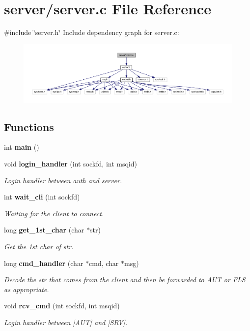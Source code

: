 \section{server/server.c File Reference}
\label{server_8c}
{\ttfamily \#include \char`\"{}server.\+h\char`\"{}}\newline
Include dependency graph for server.\+c\+:
\nopagebreak
\begin{figure}[H]
\begin{center}
\leavevmode
\includegraphics[width=350pt]{server_8c__incl}
\end{center}
\end{figure}
\subsection*{Functions}
\begin{DoxyCompactItemize}
\item 
int \textbf{ main} ()
\item 
void \textbf{ login\+\_\+handler} (int sockfd, int msqid)
\begin{DoxyCompactList}\small\item\em Login handler between auth and server. \end{DoxyCompactList}\item 
int \textbf{ wait\+\_\+cli} (int sockfd)
\begin{DoxyCompactList}\small\item\em Waiting for the client to connect. \end{DoxyCompactList}\item 
long \textbf{ get\+\_\+1st\+\_\+char} (char $\ast$str)
\begin{DoxyCompactList}\small\item\em Get the 1st char of str. \end{DoxyCompactList}\item 
long \textbf{ cmd\+\_\+handler} (char $\ast$cmd, char $\ast$msg)
\begin{DoxyCompactList}\small\item\em Decode the str that comes from the client and then be forwarded to A\+UT or F\+LS as appropriate. \end{DoxyCompactList}\item 
void \textbf{ rcv\+\_\+cmd} (int sockfd, int msqid)
\begin{DoxyCompactList}\small\item\em Login handler between [A\+UT] and [S\+RV]. \end{DoxyCompactList}\end{DoxyCompactItemize}


